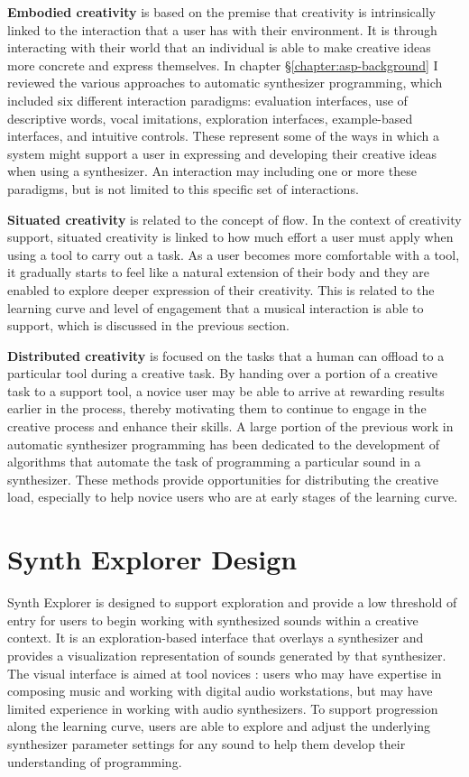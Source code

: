 \textbf{Embodied creativity} is based on the premise that creativity is intrinsically linked to the interaction that a user has with their environment. It is through interacting with their world that an individual is able to make creative ideas more concrete and express themselves. In chapter \S\ref{chapter:asp-background} I reviewed the various approaches to automatic synthesizer programming, which included six different interaction paradigms: evaluation interfaces, use of descriptive words, vocal imitations, exploration interfaces, example-based interfaces, and intuitive controls. These represent some of the ways in which a system might support a user in expressing and developing their creative ideas when using a synthesizer. An interaction may including one or more these paradigms, but is not limited to this specific set of interactions.

\textbf{Situated creativity} is related to the concept of flow. In the context of creativity support, situated creativity is linked to how much effort a user must apply when using a tool to carry out a task. As a user becomes more comfortable with a tool, it gradually starts to feel like a natural extension of their body and they are enabled to explore deeper expression of their creativity. This is related to the learning curve and level of engagement that a musical interaction is able to support, which is discussed in the previous section.

\textbf{Distributed creativity} is focused on the tasks that a human can offload to a particular tool during a creative task. By handing over a portion of a creative task to a support tool, a novice user may be able to arrive at rewarding results earlier in the process, thereby motivating them to continue to engage in the creative process and enhance their skills. A large portion of the previous work in automatic synthesizer programming has been dedicated to the development of algorithms that automate the task of programming a particular sound in a synthesizer. These methods provide opportunities for distributing the creative load, especially to help novice users who are at early stages of the learning curve.

\section{Synth Explorer Design}
Synth Explorer is designed to support exploration and provide a low threshold of entry for users to begin working with synthesized sounds within a creative context. It is an exploration-based interface that overlays a synthesizer and provides a visualization representation of sounds generated by that synthesizer. The visual interface is aimed at tool novices \cite{davis2013toward}: users who may have expertise in composing music and working with digital audio workstations, but may have limited experience in working with audio synthesizers. To support progression along the learning curve, users are able to explore and adjust the underlying synthesizer parameter settings for any sound to help them develop their understanding of programming.

